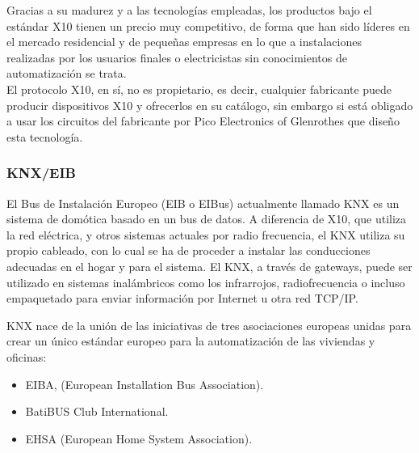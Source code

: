 Gracias a su madurez y a las tecnologías empleadas, los productos bajo el estándar X10 tienen un precio muy competitivo, de forma que han sido líderes en el mercado residencial y de pequeñas empresas en lo que a instalaciones realizadas por los usuarios finales o electricistas sin conocimientos de automatización se trata.\\

El protocolo X10, en sí, no es propietario, es decir, cualquier fabricante puede producir dispositivos X10 y ofrecerlos en su catálogo, sin embargo si está obligado a usar los circuitos del fabricante por Pico Electronics of Glenrothes que diseño esta tecnología. 

\subsubsection{KNX/EIB}
El Bus de Instalación Europeo (EIB o EIBus) actualmente llamado KNX es un sistema de domótica basado en un bus de datos. A diferencia de X10, que utiliza la red eléctrica, y otros sistemas actuales por radio frecuencia, el KNX utiliza su propio cableado, con lo cual se ha de proceder a instalar las conducciones adecuadas en el hogar y para el sistema. El KNX, a través de gateways, puede ser utilizado en sistemas inalámbricos como los infrarrojos, radiofrecuencia o incluso empaquetado para enviar información por Internet u otra red TCP/IP. \cite{serconint}

KNX nace de la unión de las iniciativas de tres asociaciones europeas unidas para crear un único estándar europeo para la automatización de las viviendas y oficinas\cite{iecor}:
\begin{itemize}
\item EIBA, (European Installation Bus Association).
\item BatiBUS Club International.
\item EHSA (European Home System Association).
\end{itemize}


